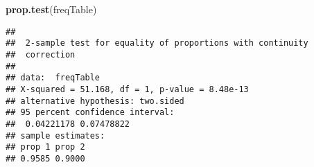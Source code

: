 \documentclass[]{article}
\newenvironment{Shaded}{\begin{snugshade}}{\end{snugshade}}
\newcommand{\KeywordTok}[1]{\textcolor[rgb]{0.13,0.29,0.53}{\textbf{#1}}}
\newcommand{\NormalTok}[1]{#1}
\begin{document}
\begin{Shaded}
\begin{Highlighting}[]
\KeywordTok{prop.test}\NormalTok{(freqTable)}
\end{Highlighting}
\end{Shaded}

\begin{verbatim}
## 
##  2-sample test for equality of proportions with continuity
##  correction
## 
## data:  freqTable
## X-squared = 51.168, df = 1, p-value = 8.48e-13
## alternative hypothesis: two.sided
## 95 percent confidence interval:
##  0.04221178 0.07478822
## sample estimates:
## prop 1 prop 2 
## 0.9585 0.9000
\end{verbatim}
\end{document}
